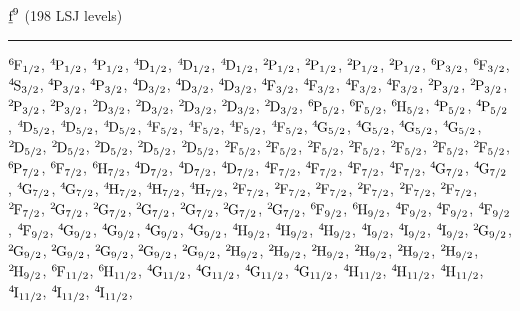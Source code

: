 \begin{mdframed}
\begin{center}
$\forb^{9}$
(198 LSJ levels)
\vspace{0.25cm}
\hrule
\vspace{0.25cm}

$\LSJterm{6}{F}{1/2}$, $\LSJterm{4}{P}{1/2}$, $\LSJterm{4}{P}{1/2}$, $\LSJterm{4}{D}{1/2}$, $\LSJterm{4}{D}{1/2}$, $\LSJterm{4}{D}{1/2}$, $\LSJterm{2}{P}{1/2}$, $\LSJterm{2}{P}{1/2}$, $\LSJterm{2}{P}{1/2}$, $\LSJterm{2}{P}{1/2}$, $\LSJterm{6}{P}{3/2}$, $\LSJterm{6}{F}{3/2}$, $\LSJterm{4}{S}{3/2}$, $\LSJterm{4}{P}{3/2}$, $\LSJterm{4}{P}{3/2}$, $\LSJterm{4}{D}{3/2}$, $\LSJterm{4}{D}{3/2}$, $\LSJterm{4}{D}{3/2}$, $\LSJterm{4}{F}{3/2}$, $\LSJterm{4}{F}{3/2}$, $\LSJterm{4}{F}{3/2}$, $\LSJterm{4}{F}{3/2}$, $\LSJterm{2}{P}{3/2}$, $\LSJterm{2}{P}{3/2}$, $\LSJterm{2}{P}{3/2}$, $\LSJterm{2}{P}{3/2}$, $\LSJterm{2}{D}{3/2}$, $\LSJterm{2}{D}{3/2}$, $\LSJterm{2}{D}{3/2}$, $\LSJterm{2}{D}{3/2}$, $\LSJterm{2}{D}{3/2}$, $\LSJterm{6}{P}{5/2}$, $\LSJterm{6}{F}{5/2}$, $\LSJterm{6}{H}{5/2}$, $\LSJterm{4}{P}{5/2}$, $\LSJterm{4}{P}{5/2}$, $\LSJterm{4}{D}{5/2}$, $\LSJterm{4}{D}{5/2}$, $\LSJterm{4}{D}{5/2}$, $\LSJterm{4}{F}{5/2}$, $\LSJterm{4}{F}{5/2}$, $\LSJterm{4}{F}{5/2}$, $\LSJterm{4}{F}{5/2}$, $\LSJterm{4}{G}{5/2}$, $\LSJterm{4}{G}{5/2}$, $\LSJterm{4}{G}{5/2}$, $\LSJterm{4}{G}{5/2}$, $\LSJterm{2}{D}{5/2}$, $\LSJterm{2}{D}{5/2}$, $\LSJterm{2}{D}{5/2}$, $\LSJterm{2}{D}{5/2}$, $\LSJterm{2}{D}{5/2}$, $\LSJterm{2}{F}{5/2}$, $\LSJterm{2}{F}{5/2}$, $\LSJterm{2}{F}{5/2}$, $\LSJterm{2}{F}{5/2}$, $\LSJterm{2}{F}{5/2}$, $\LSJterm{2}{F}{5/2}$, $\LSJterm{2}{F}{5/2}$, $\LSJterm{6}{P}{7/2}$, $\LSJterm{6}{F}{7/2}$, $\LSJterm{6}{H}{7/2}$, $\LSJterm{4}{D}{7/2}$, $\LSJterm{4}{D}{7/2}$, $\LSJterm{4}{D}{7/2}$, $\LSJterm{4}{F}{7/2}$, $\LSJterm{4}{F}{7/2}$, $\LSJterm{4}{F}{7/2}$, $\LSJterm{4}{F}{7/2}$, $\LSJterm{4}{G}{7/2}$, $\LSJterm{4}{G}{7/2}$, $\LSJterm{4}{G}{7/2}$, $\LSJterm{4}{G}{7/2}$, $\LSJterm{4}{H}{7/2}$, $\LSJterm{4}{H}{7/2}$, $\LSJterm{4}{H}{7/2}$, $\LSJterm{2}{F}{7/2}$, $\LSJterm{2}{F}{7/2}$, $\LSJterm{2}{F}{7/2}$, $\LSJterm{2}{F}{7/2}$, $\LSJterm{2}{F}{7/2}$, $\LSJterm{2}{F}{7/2}$, $\LSJterm{2}{F}{7/2}$, $\LSJterm{2}{G}{7/2}$, $\LSJterm{2}{G}{7/2}$, $\LSJterm{2}{G}{7/2}$, $\LSJterm{2}{G}{7/2}$, $\LSJterm{2}{G}{7/2}$, $\LSJterm{2}{G}{7/2}$, $\LSJterm{6}{F}{9/2}$, $\LSJterm{6}{H}{9/2}$, $\LSJterm{4}{F}{9/2}$, $\LSJterm{4}{F}{9/2}$, $\LSJterm{4}{F}{9/2}$, $\LSJterm{4}{F}{9/2}$, $\LSJterm{4}{G}{9/2}$, $\LSJterm{4}{G}{9/2}$, $\LSJterm{4}{G}{9/2}$, $\LSJterm{4}{G}{9/2}$, $\LSJterm{4}{H}{9/2}$, $\LSJterm{4}{H}{9/2}$, $\LSJterm{4}{H}{9/2}$, $\LSJterm{4}{I}{9/2}$, $\LSJterm{4}{I}{9/2}$, $\LSJterm{4}{I}{9/2}$, $\LSJterm{2}{G}{9/2}$, $\LSJterm{2}{G}{9/2}$, $\LSJterm{2}{G}{9/2}$, $\LSJterm{2}{G}{9/2}$, $\LSJterm{2}{G}{9/2}$, $\LSJterm{2}{G}{9/2}$, $\LSJterm{2}{H}{9/2}$, $\LSJterm{2}{H}{9/2}$, $\LSJterm{2}{H}{9/2}$, $\LSJterm{2}{H}{9/2}$, $\LSJterm{2}{H}{9/2}$, $\LSJterm{2}{H}{9/2}$, $\LSJterm{2}{H}{9/2}$, $\LSJterm{6}{F}{11/2}$, $\LSJterm{6}{H}{11/2}$, $\LSJterm{4}{G}{11/2}$, $\LSJterm{4}{G}{11/2}$, $\LSJterm{4}{G}{11/2}$, $\LSJterm{4}{G}{11/2}$, $\LSJterm{4}{H}{11/2}$, $\LSJterm{4}{H}{11/2}$, $\LSJterm{4}{H}{11/2}$, $\LSJterm{4}{I}{11/2}$, $\LSJterm{4}{I}{11/2}$, $\LSJterm{4}{I}{11/2}$, 
\end{center}
\end{mdframed}
